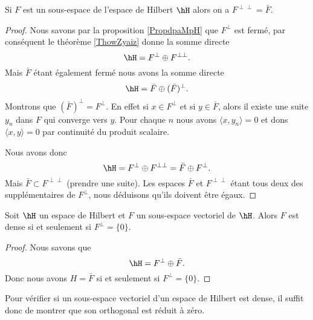 \begin{proposition}
    Si \( F\) est un sous-espace de l'espace de Hilbert \( \hH\) alors on a \( F^{\perp\perp}=\bar F\).
\end{proposition}

\begin{proof}
    Nous savons par la proposition \ref{PropdpaMpH} que \( F^{\perp}\) est fermé, par conséquent le théorème \ref{ThowZyaiz} donne la somme directe
    \begin{equation}
        \hH=F^{\perp}\oplus F^{\perp\perp}.
    \end{equation}
    Mais \( \bar F\) étant également fermé nous avons la somme directe
    \begin{equation}
        \hH=\bar F\oplus(\bar F)^{\perp}.
    \end{equation}
    Montrons que \( (\bar F)^{\perp}=F^{\perp}\). En effet si \( x\in F^{\perp}\) et si \( y\in \bar F\), alors il existe une suite \( y_n\) dans \( F\) qui converge vers \( y\). Pour chaque \( n\) nous avons \( \langle x, y_n\rangle =0\) et dons \( \langle x, y\rangle =0\) par continuité du produit scalaire.

    Nous avons donc
    \begin{equation}
        \hH=F^{\perp}\oplus F^{\perp\perp}=\bar F\oplus F^{\perp}.
    \end{equation}
    Mais \( \bar F\subset F^{\perp\perp}\) (prendre une suite). Les espaces \( \bar F\) et \( F^{\perp\perp}\) étant tous deux des supplémentaires de \( F^{\perp}\), nous déduisons qu'ils doivent être égaux.
\end{proof}

\begin{proposition}     \label{PropqiWonByiBmc}
    Soit \( \hH\) un espace de Hilbert et \( F\) un sous-espace vectoriel de \( \hH\). Alors \( F\) est dense si et seulement si \( F^{\perp}=\{ 0 \}\).
\end{proposition}

\begin{proof}
    Nous savons que
    \begin{equation}
        \hH=F^{\perp}\oplus \bar F.
    \end{equation}
    Donc nous avons \( H=\bar F\) si et seulement si \( F^{\perp}=\{ 0 \}\).
\end{proof}
Pour vérifier si un sous-espace vectoriel d'un espace de Hilbert est dense, il suffit donc de montrer que son orthogonal est réduit à zéro.

